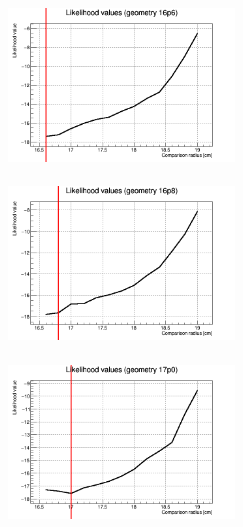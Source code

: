 \documentclass[a4paper, 11pt]{report}
\begin{document}
\begin{figure}[htbp]
\centering
\begin{minipage}[b]{.32\textwidth}
\includegraphics[width=6cm, height=4.6cm]{figs/likelihood250LowStat/likelihood16p6.png}
\end{minipage}\hfill
\begin{minipage}[b]{.32\textwidth}
\includegraphics[width=6cm, height=4.6cm]{figs/likelihood250LowStat/likelihood16p8.png}
\end{minipage} \hfill
\begin{minipage}[b]{.32\textwidth}
\includegraphics[width=6cm, height=4.6cm]{figs/likelihood250LowStat/likelihood17p0.png}
\end{minipage} \hfill \vspace{10pt}


\end{figure}
\end{document}
